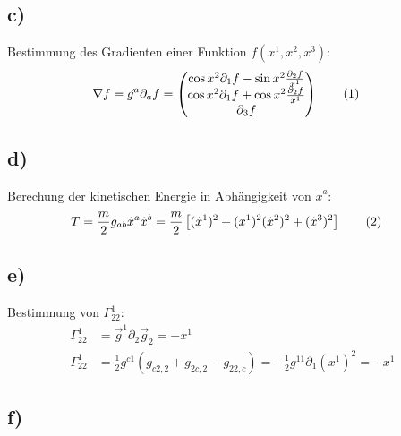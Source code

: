 \documentclass[a4paper,12pt]{article}
\newcommand\numberthis{\addtocounter{equation}{1}\tag{\theequation}}
\newcommand{\kla}{}
\begin{document}
\subsection*{c)}Bestimmung des Gradienten einer Funktion $f(x^1,x^2,x^3)$:
\begin{align*}
\nabla f&=\vec{g}^a\partial_a f=\begin{pmatrix}
\cos x^2\partial_1f-\sin x^2\frac{\partial_2f}{x^1}\\ \cos x^2\partial_1f+\cos x^2\frac{\partial_2f}{x^1} \\ \partial_3f
\end{pmatrix}\numberthis\label{eqn:zylinder:Gradient}
\end{align*}
\subsection*{d)}Berechung der kinetischen Energie in Abhängigkeit von $\dot{x}^a$:
\begin{align*}
T&=\frac{m}{2}g_{ab}\dot{x}^a\dot{x}^b=\frac{m}{2}\kla\left[ {(\dot{x}^1)^2+(x^1)^2(\dot{x}^2)^2+(\dot{x}^3)^2} \right]\numberthis\label{eqn:zylinder:Kinetische Energie}
\end{align*}
\subsection*{e)}Bestimmung von $\Gamma_{22}^1$:
\begin{align*}
\Gamma_{22}^1&=\vec{g}^1\partial_2\vec{g}_2=-x^1\\
\Gamma_{22}^1&=\frac{1}{2}g^{c1}\kla\left( {g_{c2,2}+g_{2c,2}-g_{22,c}} \right)=-\frac{1}{2}g^{11}\partial_1(x^1)^2=-x^1
\end{align*}
\subsection*{f)}
\end{document}
